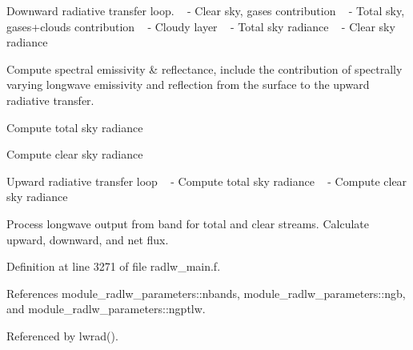 \begin{DoxyEnumerate}
\item Downward radiative transfer loop. ~\newline
 -\/ Clear sky, gases contribution ~\newline
 -\/ Total sky, gases+clouds contribution ~\newline
 -\/ Cloudy layer ~\newline
 -\/ Total sky radiance ~\newline
 -\/ Clear sky radiance
\item Compute spectral emissivity \& reflectance, include the contribution of spectrally varying longwave emissivity and reflection from the surface to the upward radiative transfer.
\item Compute total sky radiance
\item Compute clear sky radiance
\item Upward radiative transfer loop ~\newline
 -\/ Compute total sky radiance ~\newline
 -\/ Compute clear sky radiance
\item Process longwave output from band for total and clear streams. Calculate upward, downward, and net flux. 
\end{DoxyEnumerate}

Definition at line 3271 of file radlw\+\_\+main.\+f.



References module\+\_\+radlw\+\_\+parameters\+::nbands, module\+\_\+radlw\+\_\+parameters\+::ngb, and module\+\_\+radlw\+\_\+parameters\+::ngptlw.



Referenced by lwrad().

\mbox{\label{group__module__radlw__main_ga8d4a6fecb4ad25468e91661a79d4ca20}} 
